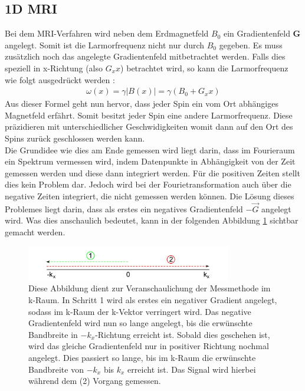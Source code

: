 \subsection{1D MRI}
\label{sec:1DMRIkapitel}
Bei dem MRI-Verfahren wird neben dem Erdmagnetfeld $B_0$ ein Gradientenfeld \textbf{G} angelegt.
Somit ist die Larmorfrequenz nicht nur durch $B_0$ gegeben.
Es muss zusätzlich noch das angelegte Gradientenfeld mitbetrachtet werden.
Falls dies speziell in x-Richtung (also $G_xx$) betrachtet wird, so kann die Larmorfrequenz wie folgt ausgedrückt werden \cite{Schmidt}:
\begin{align}
    \omega(x)=\gamma |B(x)|= \gamma \left(B_0+G_xx\right) \label{eq:gradientlarmor}
\end{align}
Aus dieser Formel geht nun hervor, dass jeder Spin ein vom Ort abhängiges Magnetfeld erfährt.
Somit besitzt jeder Spin eine andere Larmorfrequenz.
Diese präzidieren mit unterschiedlicher Geschwidigkeiten womit dann auf den Ort des Spins zurück geschlossen werden kann. \\

Die Grundidee wie dies am Ende gemessen wird liegt darin, dass im Fourieraum ein Spektrum vermessen wird, indem Datenpunkte in Abhängigkeit von der Zeit gemessen werden und diese dann integriert werden.
Für die positiven Zeiten stellt dies kein Problem dar.
Jedoch wird bei der Fourietransformation auch über die negative Zeiten integriert, die nicht gemessen werden können.
Die Lösung dieses Problemes liegt darin, dass als erstes ein negatives Gradientenfeld $-\vec{G}$ angelegt wird.
Was dies anschaulich bedeutet, kann in der folgenden Abbildung \ref{fig:1DMRI} sichtbar gemacht werden.  
\begin{figure}[H]
    \centering
    \includegraphics[width=0.8\textwidth]{Abbildungen/1DMRIkraum.JPG}
    \caption[Veranschaulichter Verlauf des k-Vektors im 1D-MRI]{Diese Abbildung dient zur Veranschaulichung der Messmethode im k-Raum.
    In Schritt 1 wird als erstes ein negativer Gradient angelegt, sodass im k-Raum der k-Vektor verringert wird.
    Das negative Gradientenfeld wird nun so lange angelegt, bis die erwünschte Bandbreite in $-k_{x}$-Richtung erreicht ist.
    Sobald dies geschehen ist, wird das gleiche Gradientenfeld nur in positiver Richtung nochmal angelegt.
    Dies passiert so lange,  bis im k-Raum die erwünschte Bandbreite von $-k_{x}$ bis $k_{x}$ erreicht ist.
    Das Signal wird hierbei während dem (2) Vorgang gemessen. \cite{Schmidt}}
    \label{fig:1DMRI}
\end{figure}

